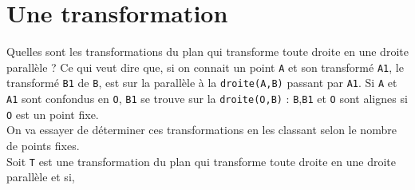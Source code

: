 \documentclass[a4paper,11pt]{book}
\begin{document}
\section{Une transformation}
Quelles sont les transformations du plan qui transforme toute droite en une 
droite parall\`ele ?
Ce qui veut dire que, si on connait un point {\tt A} et son transform\'e 
{\tt A1}, le transform\'e  {\tt B1} de {\tt B}, est sur la parall\`ele \`a la 
{\tt droite(A,B)} passant par {\tt A1}.
Si  {\tt A}  et {\tt A1} sont confondus en {\tt O}, {\tt B1} se trouve sur la 
{\tt droite(O,B)} : {\tt B},{\tt B1} et {\tt O}  sont alignes si {\tt O}
est un point fixe.\\
On va essayer de d\'eterminer ces transformations en les classant selon le
nombre de points fixes.\\
Soit {\tt T} est une transformation du plan qui transforme toute droite en une 
droite parall\`ele et si, 
\end{document}
